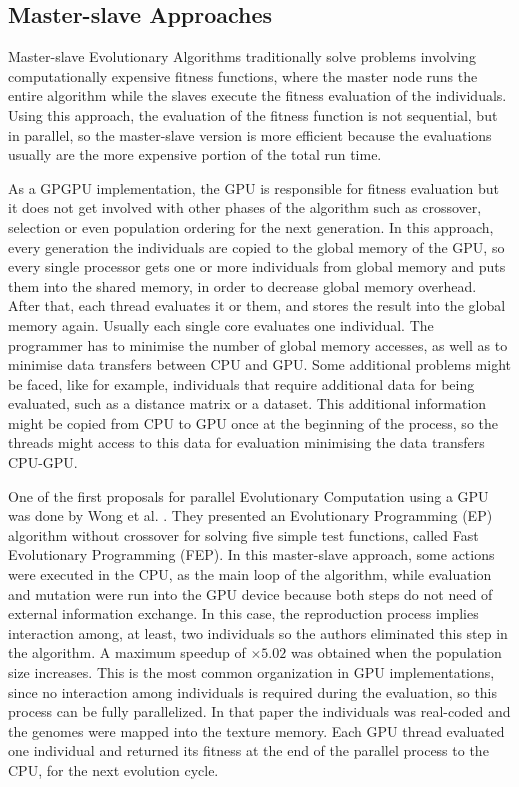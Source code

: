\documentclass[review]{elsarticle}
\begin{document}
\subsection{Master-slave Approaches}
\label{sec:masterSlave}

Master-slave Evolutionary Algorithms traditionally solve problems involving computationally expensive fitness functions, where the master node runs the entire algorithm while the slaves execute the fitness evaluation of the individuals. Using this approach, the evaluation of the fitness function is not sequential, but in parallel, so the master-slave version is more efficient because the evaluations usually are the more expensive portion of the total run time.

As a GPGPU implementation, the GPU is responsible for fitness evaluation but it does not get involved with other phases of the algorithm such as crossover, selection or even population ordering for the next generation. In this approach, every generation the individuals are copied to the global memory of the GPU, so every single processor gets one or more individuals from global memory and puts them into the shared memory, in order to decrease global memory overhead. After that, each thread evaluates it or them, and stores the result into the global memory again. Usually each single core evaluates one individual. The programmer has to minimise the number of global memory accesses, as well as to minimise data transfers between CPU and GPU. Some additional problems might be faced, like for example, individuals that require additional data for being evaluated, such as a distance matrix or a dataset. This additional information might be copied from CPU to GPU once at the beginning of the process, so the threads might access to this data for evaluation minimising the data transfers CPU-GPU. 

One of the first proposals for parallel Evolutionary Computation using a GPU was done by Wong et al. \cite{man-leung-wong-parallel-2005}. They presented an Evolutionary Programming (EP) algorithm without crossover for solving five simple test functions, called Fast Evolutionary Programming (FEP). In this master-slave approach, some actions were executed in the CPU, as the main loop of the algorithm, while evaluation and mutation were run into the GPU device because both steps do not need of external information exchange. In this case, the reproduction process implies interaction among, at least, two individuals so the authors eliminated this step in the algorithm. A maximum speedup of $\times5.02$ was obtained when the population size increases. This is the most common organization in GPU implementations, since no interaction among individuals is required during the evaluation, so this process can be fully parallelized. In that paper the individuals was real-coded and the genomes were mapped into the texture memory. Each GPU thread evaluated one individual and returned its fitness at the end of the parallel process to the CPU, for the next evolution cycle.
\end{document}
